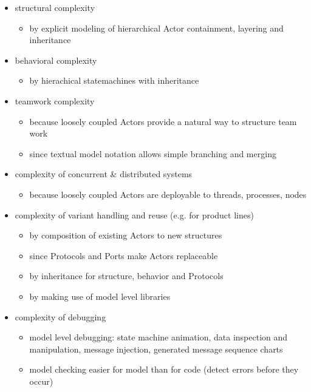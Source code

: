 \begin{itemize}
 \item structural complexity
	\begin{itemize}
\item by explicit modeling of hierarchical Actor containment, layering and inheritance \end{itemize}
\item behavioral complexity
\begin{itemize}
\item by hierachical statemachines with inheritance \end{itemize}
\item teamwork complexity
	\begin{itemize}
\item because loosely coupled Actors provide a natural way to structure team work
\item since textual model notation allows simple branching and merging \end{itemize}
\item complexity of concurrent \& distributed systems
	\begin{itemize}
\item because loosely coupled Actors are deployable to threads, processes, nodes \end{itemize}
\item complexity of variant handling and reuse (e.g. for product lines)
	\begin{itemize}
\item by composition of existing Actors to new structures
\item since Protocols and Ports make Actors replaceable
\item by inheritance for structure, behavior and Protocols
\item by making use of model level libraries  \end{itemize}
\item complexity of debugging
	 \begin{itemize}
\item model level debugging: state machine animation, data inspection and manipulation, message injection, generated message sequence charts
\item model checking easier for model than for code (detect errors before they occur)  \end{itemize}
\end{itemize}
